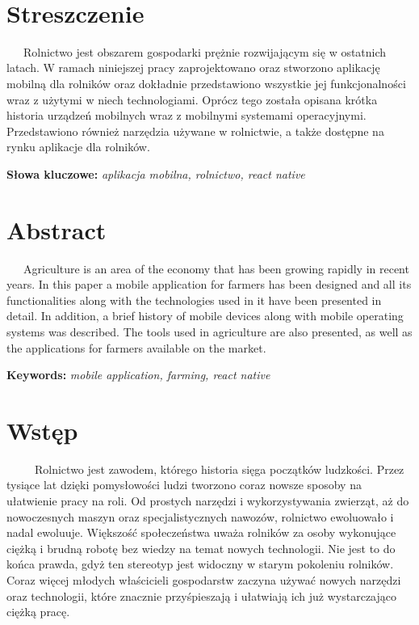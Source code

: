 \documentclass[a4paper,12pt,oneside]{book}
\begin{document}
	\thispagestyle{empty}
	
	
	\newpage
	\thispagestyle{empty}
	\
	
	\newpage
	\thispagestyle{empty}
	\chapter*{Streszczenie}
		\ \ \ Rolnictwo jest obszarem gospodarki prężnie rozwijającym się w ostatnich latach. W ramach niniejszej pracy zaprojektowano oraz stworzono aplikację mobilną dla rolników oraz dokładnie przedstawiono wszystkie jej funkcjonalności wraz z użytymi w niech technologiami. Oprócz tego została opisana krótka historia urządzeń mobilnych wraz z mobilnymi systemami operacyjnymi. Przedstawiono również narzędzia używane w rolnictwie, a także dostępne na rynku aplikacje dla rolników.
			
		\textbf{Słowa kluczowe:} \textit{aplikacja mobilna, rolnictwo, react native}
	
		\newpage
	\thispagestyle{empty}
	\chapter*{Abstract}
		\ \ \ Agriculture is an area of the economy that has been growing rapidly in recent years. In this paper a mobile application for farmers has been designed and all its functionalities along with the technologies used in it have been presented in detail. In addition, a brief history of mobile devices along with mobile operating systems was described. The tools used in agriculture are also presented, as well as the applications for farmers available on the market.
		
		\textbf{Keywords:} \textit{mobile application, farming, react native}
	
	\newpage
	\thispagestyle{empty} %
	\tableofcontents %
	
	\newpage
	\thispagestyle{empty}
	\chapter*{Wstęp} %
	
		\ \ \ \ \ Rolnictwo jest zawodem, którego historia sięga początków ludzkości. Przez tysiące lat dzięki pomysłowości ludzi tworzono coraz nowsze sposoby na ułatwienie pracy na roli. Od prostych narzędzi i wykorzystywania zwierząt, aż do nowoczesnych maszyn oraz specjalistycznych nawozów, rolnictwo ewoluowało i nadal ewoluuje. Większość społeczeństwa uważa rolników za osoby wykonujące ciężką i brudną robotę bez wiedzy na temat nowych technologii. Nie jest to do końca prawda, gdyż ten stereotyp jest widoczny w starym pokoleniu rolników. Coraz więcej młodych właścicieli gospodarstw zaczyna używać nowych narzędzi oraz technologii, które znacznie przyśpieszają i ułatwiają ich już wystarczająco ciężką pracę.
		
\end{document}
